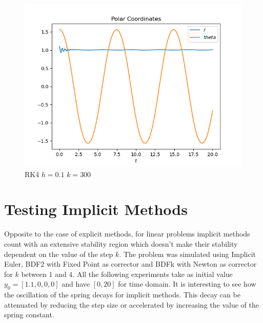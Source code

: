 \documentclass{report}
\newcounter{constant}
\begin{document}
\begin{figure}[h]
\centering
\begin{minipage}[b]{0.45\textwidth}
\centering
\includegraphics[width=\textwidth]{../Plots/RK4/rk4_h=0.1_k=300_c}
\caption{RK4 $h=0.1$ $k=300$}
\label{rk4_h=0.1_k=300_c}
\end{minipage}
\end{figure}

\section*{Testing Implicit Methods}

Opposite to the case of explicit methods, for linear problems implicit methods count with an extensive stability region which doesn’t make their stability dependent on the value of the step $k$.
The problem was simulated using Implicit Euler, BDF2 with Fixed Point as corrector and BDFk with Newton as corrector for $k$ between $1$ and $4$. All the following experiments take as initial value $y_0 = [1.1, 0, 0, 0]$ and have $[0, 20]$ for time domain.
It is interesting to see how the oscillation of the spring decays for implicit methods. This decay can be attenuated by reducing the step size or accelerated by increasing the value of the spring constant.
\end{document}
